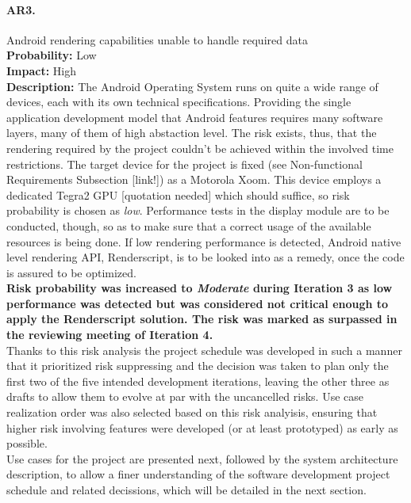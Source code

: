 		\paragraph{AR3.}Android rendering capabilities unable to handle required data\\
		\textbf{Probability:} Low\\
		\textbf{Impact:} High\\
		\textbf{Description:} The Android Operating System runs on quite a wide range of devices, each with its own technical specifications. Providing the single application development model that Android features requires many software layers, many of them of high abstaction level. The risk exists, thus, that the rendering required by the project couldn't be achieved within the involved time restrictions. The target device for the project is fixed (see Non-functional Requirements Subsection [link!]) as a Motorola Xoom. This device employs a dedicated Tegra2 GPU [quotation needed] which should suffice, so risk probability is chosen as \emph{low}. Performance tests in the display module are to be conducted, though, so as to make sure that a correct usage of the available resources is being done. 
		If low rendering performance is detected, Android native level rendering API, Renderscript, is to be looked into as a remedy, once the code is assured to be optimized.
		\\
		\textbf{Risk probability was increased to \emph{Moderate} during Iteration 3 as low performance was detected but was considered not critical enough to apply the Renderscript solution. The risk was marked as surpassed in the reviewing meeting of Iteration 4.}\\

		Thanks to this risk analysis the project schedule was developed in such a manner that it prioritized risk suppressing and the decision was taken to plan only the first two of the five intended development iterations, leaving the other three as drafts to allow them to evolve at par with the uncancelled risks.
		Use case realization order was also selected based on this risk analyisis, ensuring that higher risk involving features were developed (or at least prototyped) as early as possible.\\
		
		Use cases for the project are presented next, followed by the system architecture description, to allow a finer understanding of the software development project schedule and related decissions, which will be detailed in the next section.
	
